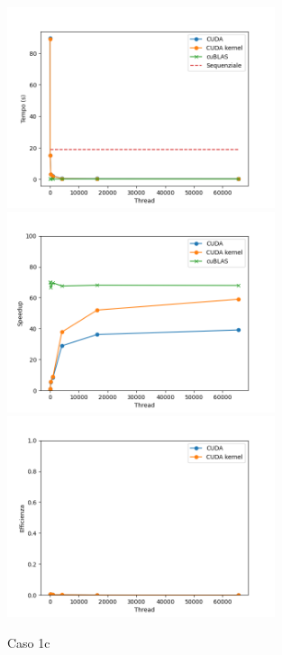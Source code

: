 \begin{figure}[h]
    \centering
    \includegraphics[width=0.7\textwidth]{./imgs/graphs/caso_a2.png}
    \includegraphics[width=0.7\textwidth]{./imgs/graphs/caso_a2_speedup.png}
    \includegraphics[width=0.7\textwidth]{./imgs/graphs/caso_a2_efficiency.png}
    \caption{Caso 1c}
\end{figure}


